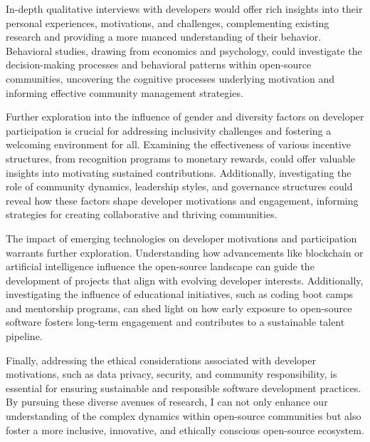 In-depth qualitative interviews with developers would offer rich insights into their personal experiences, motivations, and challenges, complementing existing research and providing a more nuanced understanding of their behavior.  Behavioral studies, drawing from economics and psychology, could investigate the decision-making processes and behavioral patterns within open-source communities, uncovering the cognitive processes underlying motivation and informing effective community management strategies.

Further exploration into the influence of gender and diversity factors on developer participation is crucial for addressing inclusivity challenges and fostering a welcoming environment for all. Examining the effectiveness of various incentive structures, from recognition programs to monetary rewards, could offer valuable insights into motivating sustained contributions. Additionally, investigating the role of community dynamics, leadership styles, and governance structures could reveal how these factors shape developer motivations and engagement, informing strategies for creating collaborative and thriving communities.

The impact of emerging technologies on developer motivations and participation warrants further exploration. Understanding how advancements like blockchain or artificial intelligence influence the open-source landscape can guide the development of projects that align with evolving developer interests.  Additionally, investigating the influence of educational initiatives, such as coding boot camps and mentorship programs, can shed light on how early exposure to open-source software fosters long-term engagement and contributes to a sustainable talent pipeline.

Finally, addressing the ethical considerations associated with developer motivations, such as data privacy, security, and community responsibility, is essential for ensuring sustainable and responsible software development practices.  By pursuing these diverse avenues of research, I can not only enhance our understanding of the complex dynamics within open-source communities but also foster a more inclusive, innovative, and ethically conscious open-source ecosystem.
